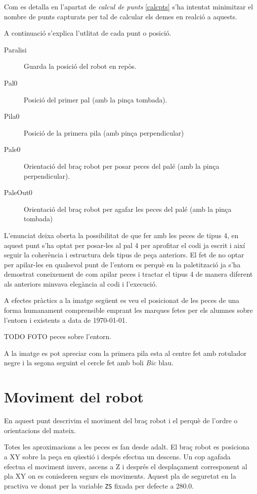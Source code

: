Com es detalla en l'apartat de \emph{calcul de punts} \ref{calcpts}
s'ha intentat minimitzar el nombre de punts capturats per tal
de calcular els demes en realció a aquests.

A continuació s'explica l'utlitat de cada punt o posició.

\begin{description}
 \item [Paralisi] Guarda la posició del robot en repòs.
 \item [Pal0] Posició del primer pal (amb la pinça tombada).
 \item [Pila0] Posició de la primera pila (amb pinça perpendicular)
 \item [Pale0] Orientació del braç robot per posar peces del palé (amb la pinça
perpendicular).
 \item [PaleOut0] Orientació del braç robot per agafar les peces del palé
(amb la pinça tombada) 
\end{description}

L'enunciat deixa oberta la possibilitat de que fer amb les peces de
tipus 4, en aquest punt s'ha optat per posar-les al pal 4 per aprofitar el codi ja escrit i
així seguir la coherència i estructura dels tipus de peça anteriors. El fet de
no optar per apilar-les en qualsevol punt de l'entorn es perquè en la paletització
ja s'ha demostrat coneixement de com apilar peces i tractar el tipus 4 de manera
diferent als anteriors minvava elegància al codi i l'execució.

A efectes pràctics a la imatge següent es veu el posicionat de les peces de una forma
humanament comprensible emprant les marques fetes per els alumnes sobre l'entorn i existents
a data de \today. 

TODO FOTO peces sobre l'entorn.

A la imatge es pot apreciar com la primera pila esta al centre fet amb
rotulador negre i la segona seguint el cercle fet amb boli \emph{Bic} blau.

\section{Moviment del robot}
En aquest punt descrivim el moviment del braç robot i el perquè de l'ordre o
orientacions del mateix.

Totes les aproximacions a les peces es fan desde adalt. El braç robot es posiciona
a XY sobre la peça en qüestió i despés efectua un descens. Un cop agafada
efectua el moviment invers, ascens a Z i després el desplaçament corresponent
al pla XY on es conisderen segurs els moviments. Aquest pla de seguretat
en la practiva ve donat per la variable \texttt{ZS} fixada per defecte
a 280.0.

